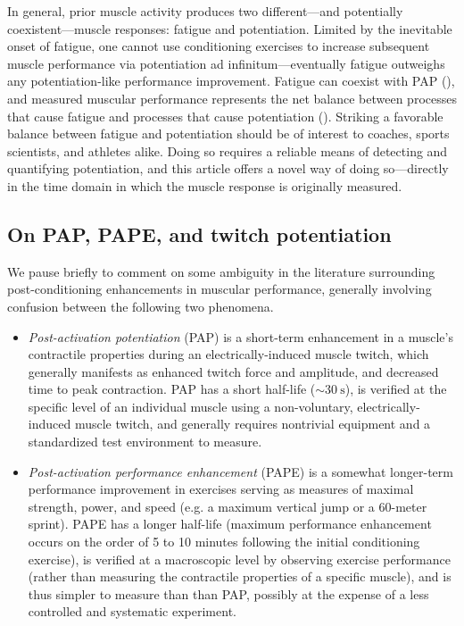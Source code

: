 \documentclass[utf8]{FrontiersinHarvard}
\begin{document}
In general, prior muscle activity produces two different---and potentially coexistent---muscle responses: fatigue and potentiation.
Limited by the inevitable onset of fatigue, one cannot use conditioning exercises to increase subsequent muscle performance via potentiation ad infinitum---eventually fatigue outweighs any potentiation-like performance improvement.
Fatigue can coexist with PAP (\cite{rassier}), and measured muscular performance represents the net balance between processes that cause fatigue and processes that cause potentiation (\cite{rassier}).
Striking a favorable balance between fatigue and potentiation should be of interest to coaches, sports scientists, and athletes alike.
Doing so requires a reliable means of detecting and quantifying potentiation, and this article offers a novel way of doing so---directly in the time domain in which the muscle response is originally measured.

\subsection{On PAP, PAPE, and twitch potentiation}
We pause briefly to comment on some ambiguity in the literature surrounding post-conditioning enhancements in muscular performance,
generally involving confusion between the following two phenomena.
\begin{itemize}

    \item \textit{Post-activation potentiation} (PAP) is a short-term enhancement in a muscle's contractile properties during an electrically-induced muscle twitch, which generally manifests as enhanced twitch force and amplitude, and decreased time to peak contraction.
    PAP has a short half-life ($ \sim \SI{30}{\second} $),
    is verified at the specific level of an individual muscle using a non-voluntary, electrically-induced muscle twitch, and generally requires nontrivial equipment and a standardized test environment to measure.

    \item \textit{Post-activation performance enhancement} (PAPE) is
    a somewhat longer-term performance improvement in exercises serving as measures of maximal strength, power, and speed (e.g. a maximum vertical jump or a 60-meter sprint).
    PAPE has a longer half-life (maximum performance enhancement occurs on the order of 5 to 10 minutes following the initial conditioning exercise),
    is verified at a macroscopic level by observing exercise performance (rather than measuring the contractile properties of a specific muscle),
    and is thus simpler to measure than than PAP, possibly at the expense of a less controlled and systematic experiment.

\end{itemize}
\end{document}
